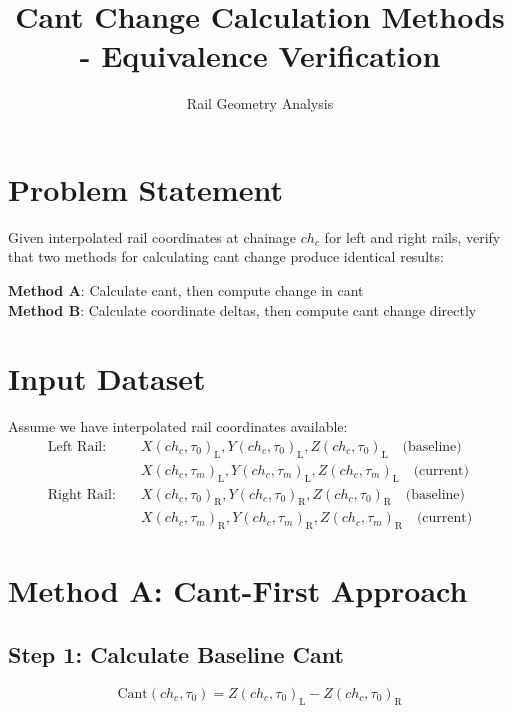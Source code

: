 \documentclass{article}
\title{Cant Change Calculation Methods - Equivalence Verification}
\author{Rail Geometry Analysis}
\date{}
\newcommand{\chainage}[1]{ch_{#1}}
\newcommand{\time}[1]{\tau_{#1}}
\newcommand{\Left}{\text{L}}
\newcommand{\Right}{\text{R}}
\newcommand{\X}[3]{X(#1, #2)_{#3}}
\newcommand{\Y}[3]{Y(#1, #2)_{#3}}
\newcommand{\Z}[3]{Z(#1, #2)_{#3}}
\newcommand{\Cant}[2]{\text{Cant}(#1, #2)}
\begin{document}
\maketitle

\section{Problem Statement}
Given interpolated rail coordinates at chainage $\chainage{c}$ for left and right rails, verify that two methods for calculating cant change produce identical results:

\textbf{Method A}: Calculate cant, then compute change in cant\\
\textbf{Method B}: Calculate coordinate deltas, then compute cant change directly

\section{Input Dataset}
Assume we have interpolated rail coordinates available:
\begin{align}
\text{Left Rail:} \quad &\X{\chainage{c}}{\time{0}}{\Left}, \Y{\chainage{c}}{\time{0}}{\Left}, \Z{\chainage{c}}{\time{0}}{\Left} \quad \text{(baseline)} \\
&\X{\chainage{c}}{\time{m}}{\Left}, \Y{\chainage{c}}{\time{m}}{\Left}, \Z{\chainage{c}}{\time{m}}{\Left} \quad \text{(current)} \\[0.5em]
\text{Right Rail:} \quad &\X{\chainage{c}}{\time{0}}{\Right}, \Y{\chainage{c}}{\time{0}}{\Right}, \Z{\chainage{c}}{\time{0}}{\Right} \quad \text{(baseline)} \\
&\X{\chainage{c}}{\time{m}}{\Right}, \Y{\chainage{c}}{\time{m}}{\Right}, \Z{\chainage{c}}{\time{m}}{\Right} \quad \text{(current)}
\end{align}

\section{Method A: Cant-First Approach}

\subsection{Step 1: Calculate Baseline Cant}
\begin{equation}
\Cant{\chainage{c}}{\time{0}} = \Z{\chainage{c}}{\time{0}}{\Left} - \Z{\chainage{c}}{\time{0}}{\Right}
\end{equation}
\end{document}
